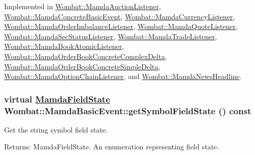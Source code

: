Implemented in \hyperlink{classWombat_1_1MamdaAuctionListener_3da43832419d2b77a848b7261b3c3d34}{Wombat::Mamda\-Auction\-Listener}, \hyperlink{classWombat_1_1MamdaConcreteBasicEvent_780ca0833332b5807a30a886e05783a6}{Wombat::Mamda\-Concrete\-Basic\-Event}, \hyperlink{classWombat_1_1MamdaCurrencyListener_6c9b1053a22182c09cdfd9ac020d71b9}{Wombat::Mamda\-Currency\-Listener}, \hyperlink{classWombat_1_1MamdaOrderImbalanceListener_de961c5bbeedc9f69136682e1adaf495}{Wombat::Mamda\-Order\-Imbalance\-Listener}, \hyperlink{classWombat_1_1MamdaQuoteListener_e94788daaae88602911d3b1a5b9ae3aa}{Wombat::Mamda\-Quote\-Listener}, \hyperlink{classWombat_1_1MamdaSecStatusListener_763d9b2fb391bc22abfe9223dd17bb8e}{Wombat::Mamda\-Sec\-Status\-Listener}, \hyperlink{classWombat_1_1MamdaTradeListener_6a4f381f676df4731509adcce8287331}{Wombat::Mamda\-Trade\-Listener}, \hyperlink{classWombat_1_1MamdaBookAtomicListener_70cfa31bc3d1010dc24c768525dbd62c}{Wombat::Mamda\-Book\-Atomic\-Listener}, \hyperlink{classWombat_1_1MamdaOrderBookConcreteComplexDelta_01e27e6bf2bf1e021ffdb8e2c6a265bf}{Wombat::Mamda\-Order\-Book\-Concrete\-Complex\-Delta}, \hyperlink{classWombat_1_1MamdaOrderBookConcreteSimpleDelta_93de17fbb8e02253ea7c67e19c2da6a4}{Wombat::Mamda\-Order\-Book\-Concrete\-Simple\-Delta}, \hyperlink{classWombat_1_1MamdaOptionChainListener_74e03d49241666a1670a07e4187bf955}{Wombat::Mamda\-Option\-Chain\-Listener}, and \hyperlink{classWombat_1_1MamdaNewsHeadline_cad33340ee13c4bdcf9de234be19b0a5}{Wombat::Mamda\-News\-Headline}.\hypertarget{classWombat_1_1MamdaBasicEvent_ef95e19f4babb0e5ea8549d6cf29d13f}{
\subsubsection[getSymbolFieldState]{\setlength{\rightskip}{0pt plus 5cm}virtual \hyperlink{namespaceWombat_93aac974f2ab713554fd12a1fa3b7d2a}{Mamda\-Field\-State} Wombat::Mamda\-Basic\-Event::get\-Symbol\-Field\-State () const}}
\label{classWombat_1_1MamdaBasicEvent_ef95e19f4babb0e5ea8549d6cf29d13f}


Get the string symbol field state. 

\begin{Desc}
\item[Returns:]Mamda\-Field\-State. An enumeration representing field state. \end{Desc}


